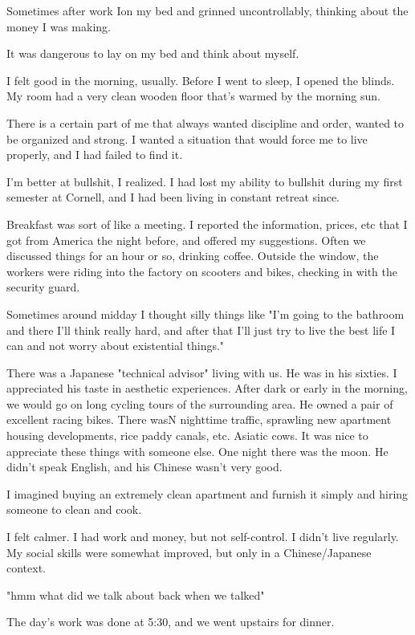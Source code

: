 


Sometimes after work Ion my bed and grinned uncontrollably, thinking about
the money I was making.

It was dangerous to lay on my bed and think about myself.

I felt good in the morning, usually. Before I went to sleep, I opened the
blinds. My room had a very clean wooden floor that's warmed by the morning sun.

There is a certain part of me that always wanted discipline and order,
wanted to be organized and strong. I wanted a situation that would force me
to live properly, and I had failed to find it.

I'm better at bullshit, I realized. I had lost my ability to bullshit during my
first semester at Cornell, and I had been living in constant retreat since.

Breakfast was sort of like a meeting. I reported the information, prices, etc
that I got from America the night before, and offered my suggestions. Often we
discussed things for an hour or so, drinking coffee. Outside the window, the
workers were riding into the factory on scooters and bikes, checking in with the
security guard.

Sometimes around midday I thought silly things like "I'm going to the bathroom
and there I'll think really hard, and after that I'll just try to live the best
life I can and not worry about existential things."

There was a Japanese "technical advisor" living with us. He was in his sixties.
I appreciated his taste in aesthetic experiences.  After dark or early in the
morning, we would go on long cycling tours of the surrounding area. He owned a
pair of excellent racing bikes.  There wasN nighttime traffic, sprawling new
apartment housing developments, rice paddy canals, etc.  Asiatic cows.   It was
nice to appreciate these things with someone else.  One night there was the
moon.  He didn't speak English, and his Chinese wasn't very good.

I imagined buying an extremely clean apartment and furnish it simply and hiring
someone to clean and cook.

I felt calmer.  I had work and money, but not self-control.  I didn't live
regularly.  My social skills were somewhat improved, but only in a
Chinese/Japanese context.

"hmm what did we talk about back when we talked"

The day's work was done at 5:30, and we went upstairs for dinner.

